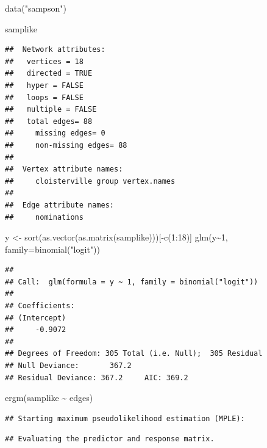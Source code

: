 \documentclass[
]{book}
\newenvironment{Shaded}{\begin{snugshade}}{\end{snugshade}}
\newcommand{\AttributeTok}[1]{\textcolor[rgb]{0.77,0.63,0.00}{#1}}
\newcommand{\DecValTok}[1]{\textcolor[rgb]{0.00,0.00,0.81}{#1}}
\newcommand{\FunctionTok}[1]{\textcolor[rgb]{0.00,0.00,0.00}{#1}}
\newcommand{\NormalTok}[1]{#1}
\newcommand{\OtherTok}[1]{\textcolor[rgb]{0.56,0.35,0.01}{#1}}
\newcommand{\SpecialCharTok}[1]{\textcolor[rgb]{0.00,0.00,0.00}{#1}}
\newcommand{\StringTok}[1]{\textcolor[rgb]{0.31,0.60,0.02}{#1}}
\begin{document}
\begin{Shaded}
\begin{Highlighting}[]
\FunctionTok{data}\NormalTok{(}\StringTok{"sampson"}\NormalTok{)}

\NormalTok{samplike}
\end{Highlighting}
\end{Shaded}

\begin{verbatim}
##  Network attributes:
##   vertices = 18 
##   directed = TRUE 
##   hyper = FALSE 
##   loops = FALSE 
##   multiple = FALSE 
##   total edges= 88 
##     missing edges= 0 
##     non-missing edges= 88 
## 
##  Vertex attribute names: 
##     cloisterville group vertex.names 
## 
##  Edge attribute names: 
##     nominations
\end{verbatim}

\begin{Shaded}
\begin{Highlighting}[]
\NormalTok{y }\OtherTok{\textless{}{-}} \FunctionTok{sort}\NormalTok{(}\FunctionTok{as.vector}\NormalTok{(}\FunctionTok{as.matrix}\NormalTok{(samplike)))[}\SpecialCharTok{{-}}\FunctionTok{c}\NormalTok{(}\DecValTok{1}\SpecialCharTok{:}\DecValTok{18}\NormalTok{)]}
\FunctionTok{glm}\NormalTok{(y}\SpecialCharTok{\textasciitilde{}}\DecValTok{1}\NormalTok{, }\AttributeTok{family=}\FunctionTok{binomial}\NormalTok{(}\StringTok{"logit"}\NormalTok{))}
\end{Highlighting}
\end{Shaded}

\begin{verbatim}
## 
## Call:  glm(formula = y ~ 1, family = binomial("logit"))
## 
## Coefficients:
## (Intercept)  
##     -0.9072  
## 
## Degrees of Freedom: 305 Total (i.e. Null);  305 Residual
## Null Deviance:       367.2 
## Residual Deviance: 367.2     AIC: 369.2
\end{verbatim}

\begin{Shaded}
\begin{Highlighting}[]
\FunctionTok{ergm}\NormalTok{(samplike }\SpecialCharTok{\textasciitilde{}}\NormalTok{ edges)}
\end{Highlighting}
\end{Shaded}

\begin{verbatim}
## Starting maximum pseudolikelihood estimation (MPLE):
\end{verbatim}

\begin{verbatim}
## Evaluating the predictor and response matrix.
\end{verbatim}
\end{document}
